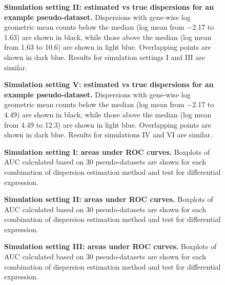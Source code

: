 \documentclass[10pt]{article}
\begin{document}
\begin{figure}[!ht] %
   \centering
   \caption{{\bf  Simulation setting II: estimated vs true dispersions for an example pseudo-dataset.} Dispersions with gene-wise log geometric mean counts below the median (log mean from $-$2.17 to 1.63) are shown in black, while those above the median (log mean from 1.63 to 10.6) are shown in light blue. Overlapping points are shown in dark blue. Results for simulation settings I and III are similar. }
   \label{fig:pp2}
\end{figure}


\begin{figure}[!ht] %
   \centering
 \caption{{\bf Simulation setting V: estimated vs true dispersions for an example pseudo-dataset.} Dispersions with gene-wise log geometric mean counts below the median (log mean from $-$2.17 to 4.49) are shown in black, while those above the median (log mean from 4.49 to 12.3) are shown in light blue. Overlapping points are shown in dark blue. Results for simulations IV and VI are similar.}
   \label{fig:pp5}
\end{figure}


\begin{figure}[!ht] %
   \centering
   \caption{{\bf Simulation setting I: areas under ROC curves.} Boxplots of AUC calculated based on 30 pseudo-datasets are shown for each combination of dispersion estimation method and test for differential expression.} 
      \label{fig:auc1}
\end{figure}

\begin{figure}[!ht] %
   \centering
   \caption{{\bf Simulation setting II: areas under ROC curves.} Boxplots of AUC calculated based on 30 pseudo-datasets are shown for each combination of dispersion estimation method and test for differential expression.} 
      \label{fig:auc2}
\end{figure}

\begin{figure}[!ht] %
   \centering
   \caption{{\bf Simulation setting III: areas under ROC curves.} Boxplots of AUC calculated based on 30 pseudo-datasets are shown for each combination of dispersion estimation method and test for differential expression.} \label{fig:auc3}
\end{figure}
\end{document}
